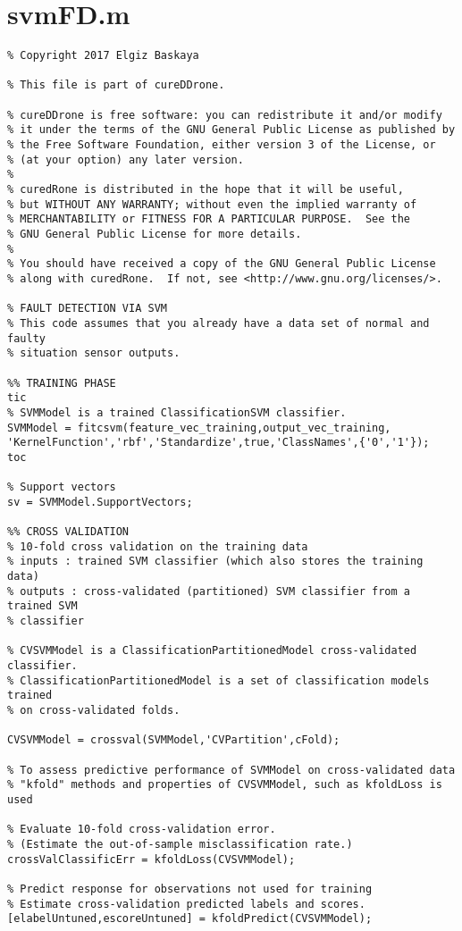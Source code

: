  
 \section{svmFD.m}
\begin{lstlisting}
% Copyright 2017 Elgiz Baskaya

% This file is part of cureDDrone.

% cureDDrone is free software: you can redistribute it and/or modify
% it under the terms of the GNU General Public License as published by
% the Free Software Foundation, either version 3 of the License, or
% (at your option) any later version.
% 
% curedRone is distributed in the hope that it will be useful,
% but WITHOUT ANY WARRANTY; without even the implied warranty of
% MERCHANTABILITY or FITNESS FOR A PARTICULAR PURPOSE.  See the
% GNU General Public License for more details.
% 
% You should have received a copy of the GNU General Public License
% along with curedRone.  If not, see <http://www.gnu.org/licenses/>.

% FAULT DETECTION VIA SVM
% This code assumes that you already have a data set of normal and faulty 
% situation sensor outputs.

%% TRAINING PHASE
tic
% SVMModel is a trained ClassificationSVM classifier.
SVMModel = fitcsvm(feature_vec_training,output_vec_training, 'KernelFunction','rbf','Standardize',true,'ClassNames',{'0','1'});
toc

% Support vectors
sv = SVMModel.SupportVectors;

%% CROSS VALIDATION
% 10-fold cross validation on the training data
% inputs : trained SVM classifier (which also stores the training data)
% outputs : cross-validated (partitioned) SVM classifier from a trained SVM
% classifier

% CVSVMModel is a ClassificationPartitionedModel cross-validated classifier.
% ClassificationPartitionedModel is a set of classification models trained 
% on cross-validated folds.

CVSVMModel = crossval(SVMModel,'CVPartition',cFold);

% To assess predictive performance of SVMModel on cross-validated data 
% "kfold" methods and properties of CVSVMModel, such as kfoldLoss is used

% Evaluate 10-fold cross-validation error.
% (Estimate the out-of-sample misclassification rate.)
crossValClassificErr = kfoldLoss(CVSVMModel);

% Predict response for observations not used for training
% Estimate cross-validation predicted labels and scores.
[elabelUntuned,escoreUntuned] = kfoldPredict(CVSVMModel);


\end{lstlisting}
